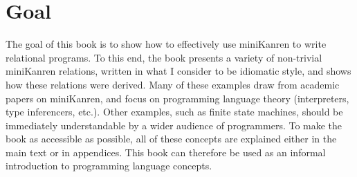 



\section{Goal}\label{sec:preface:goal}



%

The goal of this book is to show how to effectively use miniKanren to
write relational programs.
%
%
To this end, the book presents a variety of non-trivial miniKanren
relations, written in what I consider to be idiomatic style, and shows
how these relations were derived.
%
Many of these examples draw from academic papers on miniKanren, and
focus on programming language theory (interpreters, type inferencers,
etc.).
%
Other examples, such as finite state machines, should be immediately
understandable by a wider audience of programmers.
%
To make the book as accessible as possible, all of these concepts are
explained either in the main text or in appendices.
%
This book can therefore be used as an informal introduction to programming language concepts.


